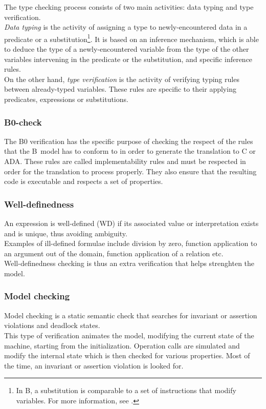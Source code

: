 The type checking process consists of two main activities: data typing and type verification.\\
{\itshape Data typing} is the activity of assigning a type to newly-encountered data in a predicate or a substitution\footnote{In B, a substitution is comparable to a set of instructions that modify variables. For more information, see \cite{bbook}.}. It is based on an inference mechanism, which is able to deduce the type of a newly-encountered variable from the type of the other variables intervening in the predicate or the substitution, and specific inference rules.\\
On the other hand, {\itshape type verification} is the activity of verifying typing rules between already-typed variables. These rules are specific to their applying predicates, expressions or substitutions.

\subsubsection{B0-check}
The B0 verification has the specific purpose of checking the respect of the rules that the B~model has to conform to in order to generate the translation to C or ADA. These rules are called implementability rules and must be respected in order for the translation to process properly. They also ensure that the resulting code is executable and respects a set of properties.

\subsubsection{Well-definedness}
An expression is well-defined (WD) if its associated value or interpretation exists and is unique, thus avoiding ambiguity.\\
Examples of ill-defined formulae include division by zero, function application to an argument out of the domain, function application of a relation etc.\\

Well-definedness checking is thus an extra verification that helps strenghten the model.

\subsubsection{Model checking}
Model checking is a static semantic check that searches for invariant or assertion violations and deadlock states.\\
This type of verification animates the model, modifying the current state of the machine, starting from the initialization. Operation calls are simulated and modify the internal state which is then checked for various properties. Most of the time, an invariant or assertion violation is looked for.\\

